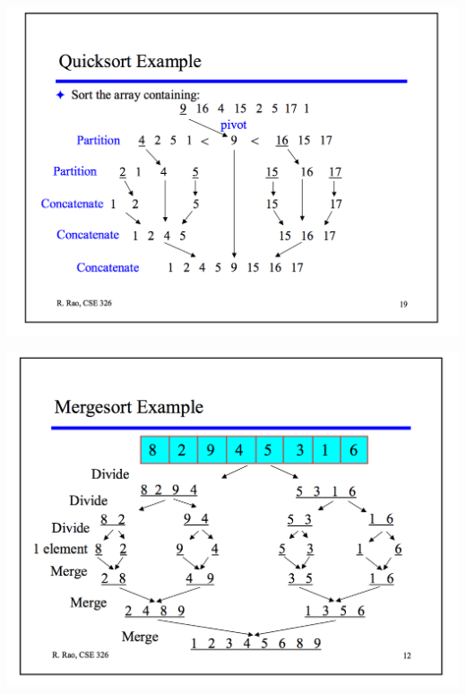 \documentclass[a4paper,11pt,twoside]{book}
\begin{document}
\begin{itemize}
\includegraphics[scale=0.45]{pics/quick_sort.png} \newline


\includegraphics[scale=0.45]{pics/merge_sort.png} \newline



\end{itemize}
\end{document}
